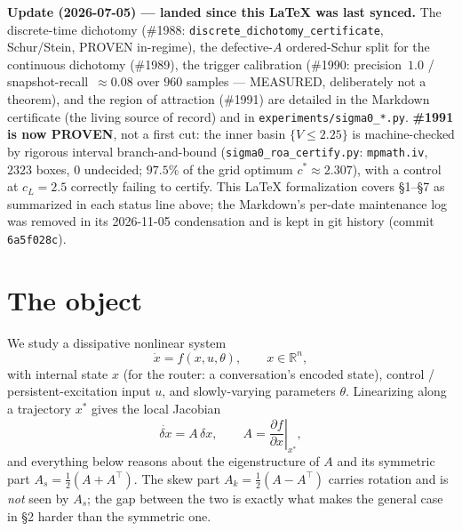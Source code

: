 \documentclass[11pt]{article}
\theoremstyle{definition}
\newcommand{\R}{\mathbb{R}}
\begin{document}
\begin{caveatbox}
\textbf{Update (2026-07-05) --- landed since this \LaTeX{} was last synced.} The
discrete-time dichotomy (\#1988: \texttt{discrete\_\allowbreak dichotomy\_\allowbreak certificate},
Schur/Stein, PROVEN in-regime), the defective-$A$ ordered-Schur split for the continuous
dichotomy (\#1989), the trigger calibration (\#1990: precision~$1.0$ / snapshot-recall~$\approx0.08$
over $960$ samples --- MEASURED, deliberately not a theorem), and the region of attraction
(\#1991) are detailed in the Markdown certificate (the living source of record) and in
\texttt{experiments/sigma0\_*.py}. \textbf{\#1991 is now PROVEN}, not a first cut: the inner
basin $\{V\le2.25\}$ is machine-checked by rigorous interval branch-and-bound
(\texttt{sigma0\_roa\_certify.py}: \texttt{mpmath.iv}, $2323$ boxes, $0$ undecided; $97.5\%$ of
the grid optimum $c^\ast\approx2.307$), with a control at $c_L=2.5$ correctly failing to
certify. This \LaTeX{} formalization covers \S1--\S7 as summarized in each status line above;
the Markdown's per-date maintenance log was removed in its 2026-11-05 condensation and is
kept in git history (commit \texttt{6a5f028c}).
\end{caveatbox}

\tableofcontents
\bigskip

\section{The object}
We study a dissipative nonlinear system
\begin{equation}
\dot{x} = f(x,u,\theta), \qquad x \in \R^{n},
\end{equation}
with internal state $x$ (for the router: a conversation's encoded state),
control / persistent-excitation input $u$, and slowly-varying parameters $\theta$.
Linearizing along a trajectory $x^\ast$ gives the local Jacobian
\begin{equation}
\dot{\delta x} = A\,\delta x, \qquad
A = \left.\frac{\partial f}{\partial x}\right|_{x^\ast},
\end{equation}
and everything below reasons about the eigenstructure of $A$ and its symmetric
part $A_s = \tfrac12(A + A^{\top})$. The skew part $A_k=\tfrac12(A-A^\top)$ carries
rotation and is \emph{not} seen by $A_s$; the gap between the two is exactly what
makes the general case in \S2 harder than the symmetric one.

\end{document}
